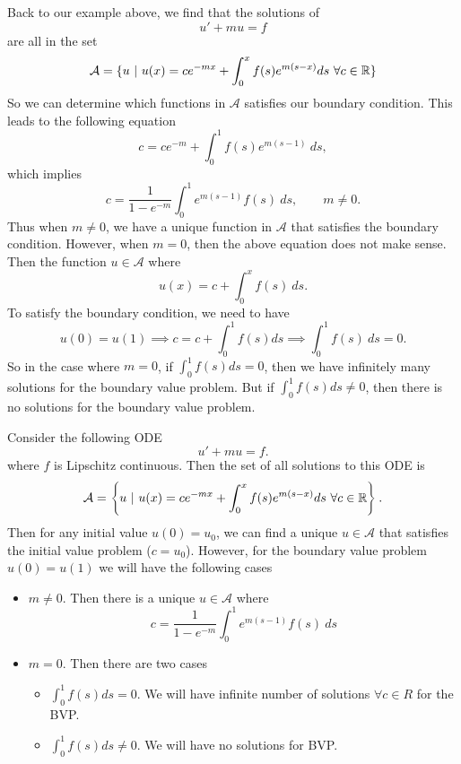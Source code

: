 Back to our example above, we find that the solutions of 
\[ u' + mu = f\] 
are all in the set
\begin{equation*}
	\mathcal{A} = \set{u\ |\ u(x)=ce^{-mx} + \int_{0}^{x}f(s)e^{m(s-x)}ds\ \forall c\in \R}
\end{equation*}
So we can determine which functions in $\mathcal{A}$ satisfies our boundary condition. This leads to the following equation
\[ c  = ce^{-m} + \int_{0}^{1}f(s)e^{m(s-1)}\ ds, \]
which implies
\[ \boxed{c = \frac{1}{1-e^{-m}}\int_{0}^{1}e^{m(s-1)}f(s)\ ds, \qquad m\neq 0}. \]
Thus when $m\neq 0$, we have a unique function in $\mathcal{A}$ that satisfies the boundary condition. However, when $m=0$, then the above equation does not make sense. Then the function $u\in \mathcal{A}$ where
\[ u(x) = c+  \int_{0}^{x}f(s)\ ds. \]
To satisfy the boundary condition, we need to have
\[ u(0) = u(1) \implies c = c+\int_{0}^{1}f(s) ds \implies \boxed{\int_{0}^{1}f(s)\ ds = 0}. \]
So in the case where $m=0$, if $\int_{0}^{1}f(s)ds=0$, then we have infinitely many solutions for the boundary value problem. But if $\int_{0}^{1}f(s)ds \neq 0$, then there is no solutions for the boundary value problem.

\begin{summary}
	Consider the following ODE
	\[ u' + mu = f. \]
	where $f$ is Lipschitz continuous. Then the set of all solutions to this ODE is 
	\[ 	\mathcal{A} = \left\{u\ |\ u(x)=ce^{-mx} + \int_{0}^{x}f(s)e^{m(s-x)}ds\ \forall c\in \mathbb{R} \right\}.\]
	Then for any initial value $u(0) = u_0$, we can find a unique $u\in\mathcal{A}$ that satisfies the initial value problem ($c=u_0$). However, for the boundary value problem $u(0)=u(1)$ we will have the following cases
	\begin{itemize}
		\item $m\neq 0$. Then there is a unique $u\in\mathcal{A}$ where
		\[ c = \frac{1}{1-e^{-m}}\int_{0}^{1}e^{m(s-1)}f(s)\ ds \]
		\item $m =0$. Then there are two cases
		\begin{itemize}
			\item $\int_{0}^{1}f(s)ds = 0$. We will have infinite number of solutions $\forall c\in R$ for the BVP.
			\item $\int_{0}^{1}f(s)ds \neq 0$. We will have no solutions for BVP.
		\end{itemize}
	\end{itemize}
\end{summary}


